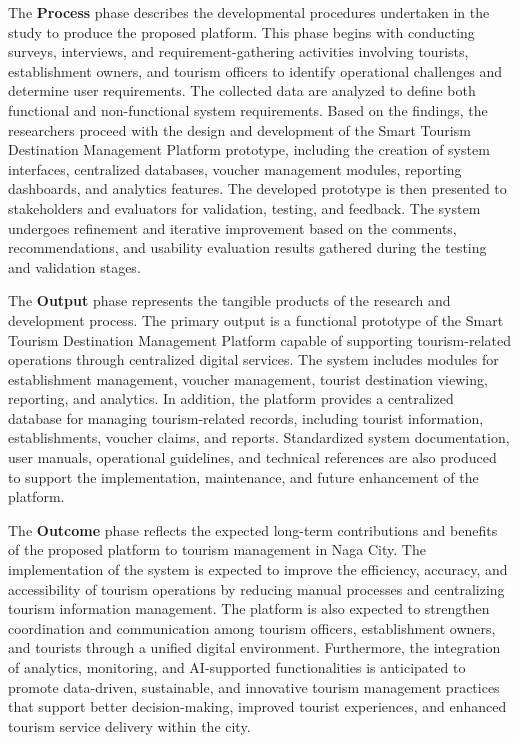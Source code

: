 \documentclass{research}
\begin{document}
The \textbf{Process} phase describes the developmental procedures undertaken in the study to produce the proposed platform. This phase begins with conducting surveys, interviews, and requirement-gathering activities involving tourists, establishment owners, and tourism officers to identify operational challenges and determine user requirements. The collected data are analyzed to define both functional and non-functional system requirements. Based on the findings, the researchers proceed with the design and development of the Smart Tourism Destination Management Platform prototype, including the creation of system interfaces, centralized databases, voucher management modules, reporting dashboards, and analytics features. The developed prototype is then presented to stakeholders and evaluators for validation, testing, and feedback. The system undergoes refinement and iterative improvement based on the comments, recommendations, and usability evaluation results gathered during the testing and validation stages.

The \textbf{Output} phase represents the tangible products of the research and development process. The primary output is a functional prototype of the Smart Tourism Destination Management Platform capable of supporting tourism-related operations through centralized digital services. The system includes modules for establishment management, voucher management, tourist destination viewing, reporting, and analytics. In addition, the platform provides a centralized database for managing tourism-related records, including tourist information, establishments, voucher claims, and reports. Standardized system documentation, user manuals, operational guidelines, and technical references are also produced to support the implementation, maintenance, and future enhancement of the platform.

The \textbf{Outcome} phase reflects the expected long-term contributions and benefits of the proposed platform to tourism management in Naga City. The implementation of the system is expected to improve the efficiency, accuracy, and accessibility of tourism operations by reducing manual processes and centralizing tourism information management. The platform is also expected to strengthen coordination and communication among tourism officers, establishment owners, and tourists through a unified digital environment. Furthermore, the integration of analytics, monitoring, and AI-supported functionalities is anticipated to promote data-driven, sustainable, and innovative tourism management practices that support better decision-making, improved tourist experiences, and enhanced tourism service delivery within the city.
\end{document}

